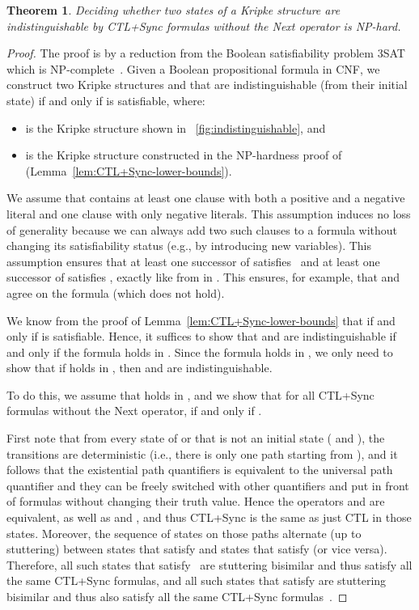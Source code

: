 \documentclass{article}
\newtheorem{theorem}{Theorem}
\begin{document}
\begin{theorem}\label{theo:CTL+Sync-without-next-NP-hard}
Deciding whether two states of a Kripke structure are indistinguishable 
by CTL+Sync formulas without the Next operator is NP-hard.
\end{theorem}

\begin{proof}
The proof is by a reduction from the Boolean satisfiability problem 3SAT which is NP-complete~\cite{Cook71}.
Given a Boolean propositional formula  in CNF, we construct 
two Kripke structures  and  that are indistinguishable (from their initial state)
if and only if  is satisfiable, where:
\begin{itemize}
\item  is the Kripke structure shown in \figurename~\ref{fig:indistinguishable}, and 
\item  is the Kripke structure constructed in the NP-hardness proof of  (Lemma~\ref{lem:CTL+Sync-lower-bounds}).
\end{itemize}

We assume that  contains at 
least one clause with both a positive and a negative literal 
and one clause with only negative literals. This assumption 
induces no loss of generality because we can always add two
such clauses to a formula without changing its satisfiability 
status (e.g., by introducing new variables).
This assumption ensures that at least one successor of  satisfies~ 
and at least one successor of  satisfies , exactly like from  in . 
This ensures, for example, that  and  agree on the formula  
(which does not hold). 

We know from the proof of Lemma~\ref{lem:CTL+Sync-lower-bounds}
that  if and only if  is satisfiable.
Hence, it suffices to show that  and  are indistinguishable
if and only if the formula  holds in . 
Since the formula  holds in , we only need to show that 
if  holds in , then  and  are indistinguishable.

To do this, we assume that  holds in , and we show that 
for all CTL+Sync formulas  without the Next operator, 
 if and only if .

First note that from every state  of  or  that is not
an initial state ( and ), the transitions are
deterministic (i.e., there is only one path starting from ), and it follows
that the existential path quantifiers is equivalent to the universal path quantifier
and they can be freely switched with other quantifiers
and put in front of formulas without changing their truth value. 
Hence the operators  and  are equivalent, 
as well as  and , and thus CTL+Sync is the same as just CTL in those states. 
Moreover, the sequence of states on those paths alternate (up to stuttering) 
between states that satisfy  and states that satisfy  (or vice versa).
Therefore, all such states that satisfy~ are stuttering bisimilar and thus
satisfy all the same CTL+Sync formulas, and all such states that satisfy  are stuttering 
bisimilar and thus also satisfy all the same CTL+Sync formulas~\cite{BCG88}.



\end{proof}
\end{document}

